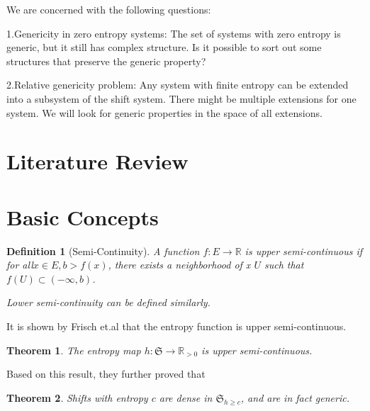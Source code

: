 \documentclass{article}
\newtheorem{definition}{Definition}
\newtheorem{theorem}{Theorem}
\begin{document}
\begin{CJK}{UTF8}{gbsn}
We are concerned with the following questions:

1.Genericity in zero entropy systems: The set of systems with zero entropy is generic, but it still has complex structure. Is it possible to sort out some structures that preserve the generic property?

2.Relative genericity problem: Any system with finite entropy can be extended into a subsystem of the shift system. There might be multiple extensions for one system. We will look for generic properties in the space of all extensions.



\section{Literature Review}




\section{Basic Concepts}




\begin{definition}[Semi-Continuity]
	A function $f:E\rightarrow \mathbb{R}$ is upper semi-continuous if for all$x \in E, b>f(x)$, there exists  a neighborhood of x $U$ such that $f(U)\subset (-\infty,b)$.
	
	Lower semi-continuity can be defined similarly.
\end{definition}

It is shown by Frisch\cite{Frisch} et.al that the entropy function is upper semi-continuous.

\begin{theorem}
	The entropy map $h:\mathfrak{S}\rightarrow \mathbb{R}_{>0}$ is upper semi-continuous.
\end{theorem}

Based on this result, they further proved that

\begin{theorem}
	Shifts with entropy $c$ are dense in $\mathfrak{S}_{h\geq c}$, and are in fact generic.
\end{theorem}











\end{CJK}
\end{document}

